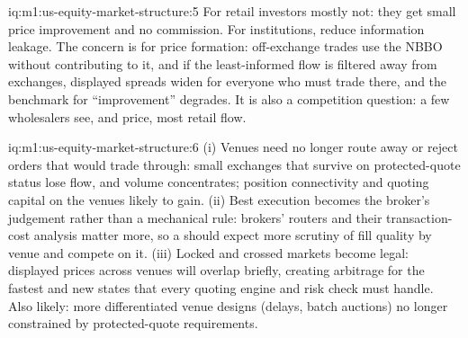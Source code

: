 \begin{solution}{iq:m1:us-equity-market-structure:5}
For retail investors mostly not: they get small price improvement and no
commission. For institutions,  reduce information leakage. The
concern is for price formation: off-exchange trades use the NBBO without
contributing to it, and if the least-informed flow is filtered away from
exchanges, displayed spreads widen for everyone who must trade there, and
the benchmark for ``improvement'' degrades. It is also a competition question:
a few wholesalers see, and price, most retail flow.
\end{solution}

\begin{solution}{iq:m1:us-equity-market-structure:6}
(i) Venues need no longer route away or reject orders that would trade
through: small exchanges that survive on protected-quote status lose flow,
and volume concentrates; position connectivity and quoting capital on the
venues likely to gain. (ii) Best execution becomes the broker's judgement
rather than a mechanical rule: brokers' routers and their transaction-cost
analysis matter more, so a  should expect more scrutiny of fill
quality by venue and compete on it. (iii) Locked and crossed markets become
legal: displayed prices across venues will overlap briefly, creating
arbitrage for the fastest and new states that every quoting engine and risk
check must handle. Also likely: more differentiated venue designs (delays,
batch auctions) no longer constrained by protected-quote requirements.
\end{solution}
